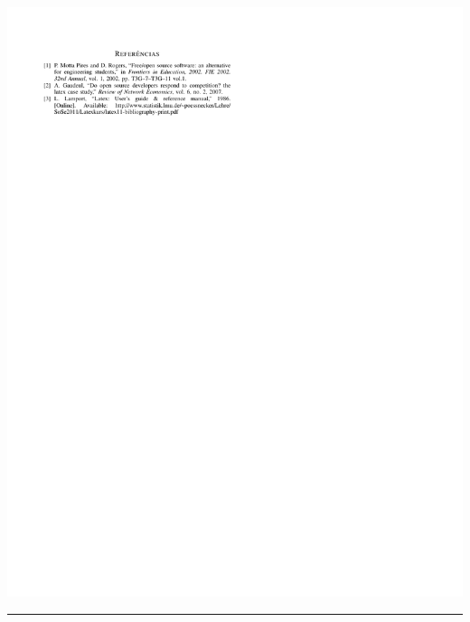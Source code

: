 {\clearpage
\label{referencias}

\noindent\includegraphics[trim=0 19cm 0 0,clip]{conteudo/intro_modelo_conferencias/references/ieee-refs}

\hrule

}
